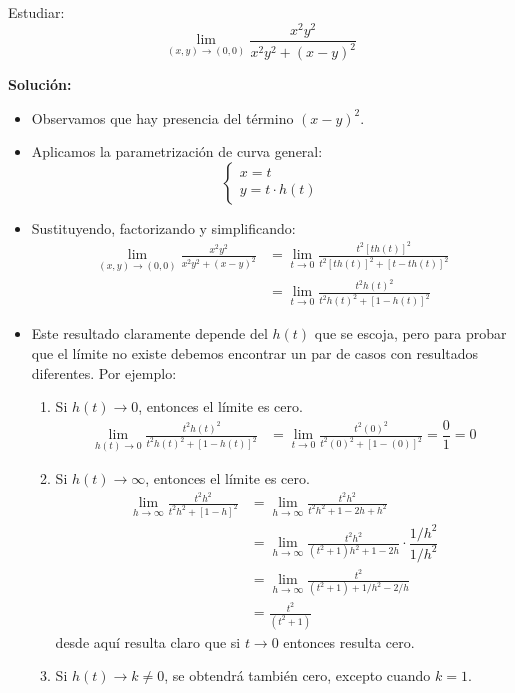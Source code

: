 \begin{ejemplo}
    Estudiar:
    \[
    \lim_{(x,y) \to (0,0)}\frac{x^2y^2}{x^2y^2+(x-y)^2}
    \]
\end{ejemplo}
\textbf{Solución:}
\begin{itemize}
    \item Observamos que hay presencia del término $(x-y)^2$.
    \item Aplicamos la parametrización de curva general:
    $$\begin{cases} x = t \\ y = t \cdot h(t) \end{cases}$$
    \item Sustituyendo, factorizando y simplificando:
    \begin{align}
        \lim_{(x,y) \to (0,0)}\frac{x^2y^2}{x^2y^2+(x-y)^2} &= \lim_{t \to 0}\frac{t^2[th(t)]^2}{t^2[th(t)]^2+[t-th(t)]^2} \\
         &= \lim_{t \to 0}\frac{t^2h(t)^2}{t^2h(t)^2+[1-h(t)]^2} 
        \label{limite_parametrico_generalizado_1}
    \end{align}
    \item Este resultado claramente depende del $h(t)$ que se escoja, pero para probar que el límite no existe debemos encontrar un par de casos con resultados diferentes. Por ejemplo:
    \begin{enumerate}
        \item[-] Si $h(t) \to 0$, entonces el límite es cero.
        \begin{align*}
        \lim_{h(t) \to 0}\frac{t^2h(t)^2}{t^2h(t)^2+[1-h(t)]^2} 
         &= \lim_{t \to 0}\frac{t^2(0)^2}{t^2(0)^2+[1-(0)]^2}=\dfrac{0}{1}=0
        \end{align*}
        \item[-] Si $h(t) \to \infty$, entonces el límite es cero.
        \begin{align*}
        \lim_{h \to \infty}\frac{t^2h^2}{t^2h^2+[1-h]^2} 
         &= \lim_{h \to \infty}\frac{t^2h^2}{t^2h^2+1-2h+h^2}\\
         &= \lim_{h \to \infty}\frac{t^2h^2}{(t^2+1)h^2+1-2h} \cdot \dfrac{1/h^2}{1/h^2}\\
         &= \lim_{h \to \infty}\frac{t^2}{(t^2+1)+1/h^2-2/h}\\
         &= \frac{t^2}{(t^2+1)}
        \end{align*}
        desde aquí resulta claro que si $t \to 0$ entonces resulta cero.
        \item[-] Si $h(t) \to k \neq 0$, se obtendrá también cero, excepto cuando $k=1$.

\end{enumerate}
\end{itemize}
